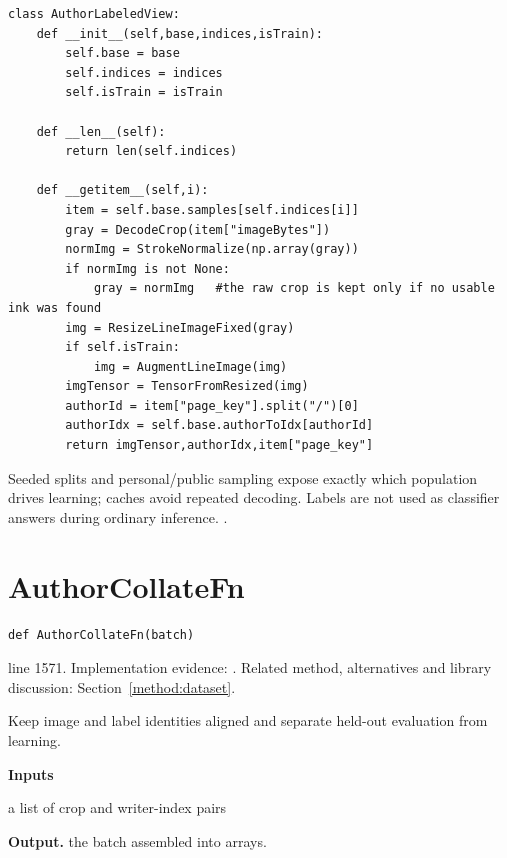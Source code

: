 \begin{lstlisting}[style=plain]
class AuthorLabeledView:
    def __init__(self,base,indices,isTrain):
        self.base = base
        self.indices = indices
        self.isTrain = isTrain

    def __len__(self):
        return len(self.indices)

    def __getitem__(self,i):
        item = self.base.samples[self.indices[i]]
        gray = DecodeCrop(item["imageBytes"])
        normImg = StrokeNormalize(np.array(gray))
        if normImg is not None:
            gray = normImg   #the raw crop is kept only if no usable ink was found
        img = ResizeLineImageFixed(gray)
        if self.isTrain:
            img = AugmentLineImage(img)
        imgTensor = TensorFromResized(img)
        authorId = item["page_key"].split("/")[0]
        authorIdx = self.base.authorToIdx[authorId]
        return imgTensor,authorIdx,item["page_key"]
\end{lstlisting}
Seeded splits and personal/public sampling expose exactly which population drives learning; caches avoid repeated decoding. Labels are not used as classifier answers during ordinary inference. \cite{marti2002,code2026,torchdata}.


\section{AuthorCollateFn}\label{fn:train:AuthorCollateFn}
\begin{lstlisting}[style=sig]
def AuthorCollateFn(batch)
\end{lstlisting}
 line 1571. Implementation evidence: \cite{code2026}. Related method, alternatives and library discussion: Section~\ref{method:dataset}.


Keep image and label identities aligned and separate held-out evaluation from learning.




\noindent\textbf{Inputs}
\begin{description}[leftmargin=2.2em,style=nextline,font=\normalfont\ttfamily]\setlength\itemsep{1pt}
  \item[{batch}] \normalfont a list of crop and writer-index pairs
\end{description}

\noindent\textbf{Output.} the batch assembled into arrays.


